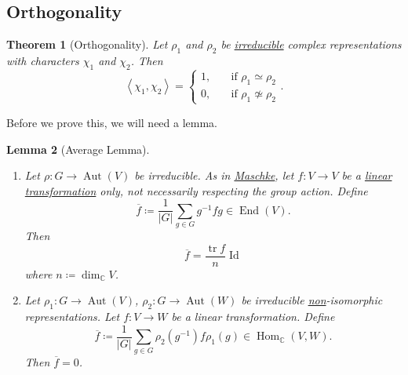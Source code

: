 \documentclass[12pt]{article}
\newcommand{\cx}{\mathbb{C}}
\newcommand\inv[1]{#1^{-1}}
\newcommand{\vbrack}[1]{\left \langle #1 \right \rangle}
\newtheorem{theorem}{Theorem}[section]
\newtheorem{lemma}[theorem]{Lemma}
\theoremstyle{definition}
\DeclareMathOperator\Aut{Aut}
\DeclareMathOperator\End{End}
\DeclareMathOperator\Hom{Hom}
\DeclareMathOperator\Id{Id}
\DeclareMathOperator\tr{tr}
\begin{document}
\subsection{Orthogonality}
\begin{theorem}[Orthogonality]
    Let $\rho_1$ and $\rho_2$ be \underline{irreducible} complex representations with characters $\chi_1$ and $\chi_2$. Then 
    \begin{equation}
        \vbrack{ \chi_1 , \chi_2 } = 
        \begin{cases}
            1 , & \quad \text{if } \rho_1 \simeq \rho_2 \\
            0 , & \quad \text{if } \rho_1 \not\simeq \rho_2
        \end{cases}.
    \end{equation}
\end{theorem}
Before we prove this, we will need a lemma.
\begin{lemma}[Average Lemma]
    \noindent 
    \begin{enumerate}
        \item Let $\rho : G \to \Aut(V)$ be irreducible. As in \underline{Maschke}, let $f : V \to V$ be a \underline{linear transformation} only, not necessarily respecting the group action. Define
        \begin{equation}
            \overline{f} \coloneqq  \frac{1}{|G|} \sum\limits_{g \in G} \inv{g} f g \in \End(V).
        \end{equation}
        Then 
        \begin{equation}
            \boxed{\overline{f} = \frac{\tr f}{n  } \Id }
        \end{equation}
        where $n \coloneqq  \dim_{\cx} V$.
        \item Let $\rho_1 : G \to \Aut(V)$, $\rho_2 : G \to \Aut(W)$ be irreducible \underline{non}-isomorphic representations. Let $f : V \to W$ be a linear transformation. Define
        \begin{equation}
            \overline{f} \coloneqq  \frac{1}{|G|} \sum\limits_{g \in G} \rho_2\left( \inv{g} \right) f \rho_1(g) \in \Hom_{\cx}(V,W).
        \end{equation}
        Then $\overline{f} = 0$.
    \end{enumerate}
\end{lemma}
\end{document}
